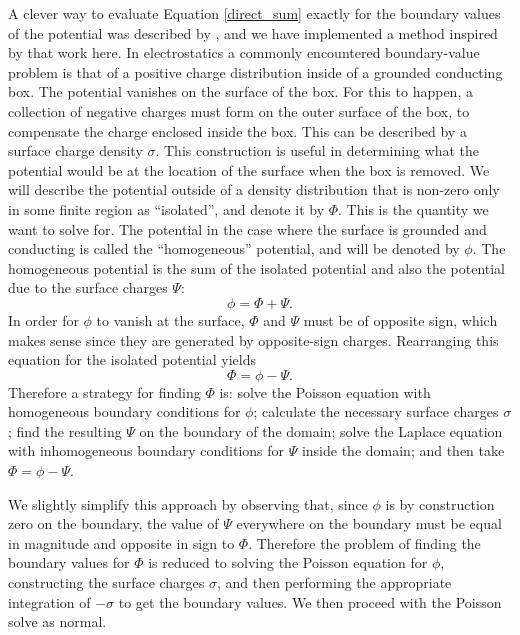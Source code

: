 \documentclass[12pt,preprint]{aastex}
\begin{document}
A clever way to evaluate Equation \ref{direct_sum} exactly for the boundary values of the potential was described by \cite{james77}, and we have implemented a method inspired by that work here. In electrostatics a commonly encountered boundary-value problem is that of a positive charge distribution inside of a grounded conducting box. The potential vanishes on the surface of the box. For this to happen, a collection of negative charges must form on the outer surface of the box, to compensate the charge enclosed inside the box. This can be described by a surface charge density $\sigma$. This construction is useful in determining what the potential would be at the location of the surface when the box is removed. We will describe the potential outside of a density distribution that is non-zero only in some finite region as ``isolated'', and denote it by $\Phi$. This is the quantity we want to solve for. The potential in the case where the surface is grounded and conducting is called the ``homogeneous'' potential, and will be denoted by $\phi$. The homogeneous potential is the sum of the isolated potential and also the potential due to the surface charges $\Psi$:
\begin{equation*}
  \phi = \Phi + \Psi.
\end{equation*}
In order for $\phi$ to vanish at the surface, $\Phi$ and $\Psi$ must be of opposite sign, which makes sense since they are generated by opposite-sign charges. Rearranging this equation for the isolated potential yields
\begin{equation}
  \Phi = \phi - \Psi.
\end{equation}
Therefore a strategy for finding $\Phi$ is: solve the Poisson equation with homogeneous boundary conditions for $\phi$; calculate the necessary surface charges $\sigma$; find the resulting $\Psi$ on the boundary of the domain; solve the Laplace equation with inhomogeneous boundary conditions for $\Psi$ inside the domain; and then take $\Phi = \phi - \Psi$.

We slightly simplify this approach by observing that, since $\phi$ is by construction zero on the boundary, the value of $\Psi$ everywhere on the boundary must be equal in magnitude and opposite in sign to $\Phi$. Therefore the problem of finding the boundary values for $\Phi$ is reduced to solving the Poisson equation for $\phi$, constructing the surface charges $\sigma$, and then performing the appropriate integration of $-\sigma$ to get the boundary values. We then proceed with the Poisson solve as normal.
\end{document}
